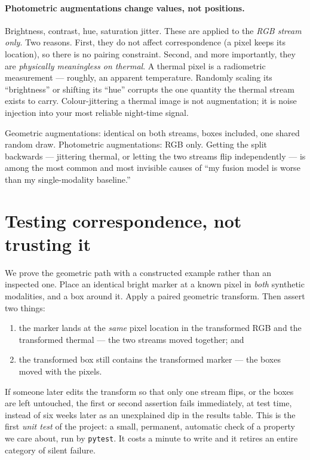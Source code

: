 \documentclass[../main.tex]{subfiles}
\begin{document}
\paragraph{Photometric augmentations change values, not positions.} Brightness, contrast, hue,
saturation jitter. These are applied to the \emph{RGB stream only}. Two reasons. First, they do
not affect correspondence (a pixel keeps its location), so there is no pairing constraint.
Second, and more importantly, they are \emph{physically meaningless on thermal}. A thermal pixel
is a radiometric measurement --- roughly, an apparent temperature. Randomly scaling its
``brightness'' or shifting its ``hue'' corrupts the one quantity the thermal stream exists to
carry. Colour-jittering a thermal image is not augmentation; it is noise injection into your most
reliable night-time signal.

\begin{lesson}
Geometric augmentations: identical on both streams, boxes included, one shared random draw.
Photometric augmentations: RGB only. Getting the split backwards --- jittering thermal, or
letting the two streams flip independently --- is among the most common and most invisible causes
of ``my fusion model is worse than my single-modality baseline.''
\end{lesson}

\section{Testing correspondence, not trusting it}

We prove the geometric path with a constructed example rather than an inspected one. Place an
identical bright marker at a known pixel in \emph{both} synthetic modalities, and a box around
it. Apply a paired geometric transform. Then assert two things:

\begin{enumerate}
  \item the marker lands at the \emph{same} pixel location in the transformed RGB and the
        transformed thermal --- the two streams moved together; and
  \item the transformed box still contains the transformed marker --- the boxes moved with the
        pixels.
\end{enumerate}

If someone later edits the transform so that only one stream flips, or the boxes are left
untouched, the first or second assertion fails immediately, at test time, instead of six weeks
later as an unexplained dip in the results table. This is the first \emph{unit test} of the
project: a small, permanent, automatic check of a property we care about, run by \texttt{pytest}.
It costs a minute to write and it retires an entire category of silent failure.
\end{document}
